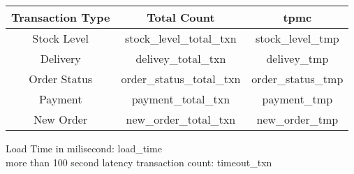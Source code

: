 \documentclass[../../main.tex]{subfiles}
\begin{document}
    \begin{minipage}{0.5\textwidth}
        \begin{center}
            \begin{tabular}{ |c|c|c| } 
                \hline
                Transaction Type & Total Count & tpmc\\
                \hline
                Stock Level & {stock_level_total_txn} & {stock_level_tmp} \\
                Delivery & {delivey_total_txn} & {delivey_tmp} \\
                Order Status & {order_status_total_txn} & {order_status_tmp} \\
                Payment & {payment_total_txn} & {payment_tmp} \\
                New Order & {new_order_total_txn} & {new_order_tmp} \\
                \hline
            \end{tabular}
        \end{center}
    \end{minipage}
    \begin{minipage}{0.5\textwidth}
    \end{minipage}
    \begin{minipage}{0.5\textwidth}
        Load Time in milisecond: {load_time} \\
        more than 100 second latency transaction count: {timeout_txn} \\
    \end{minipage}
    \pagebreak
\end{document}
